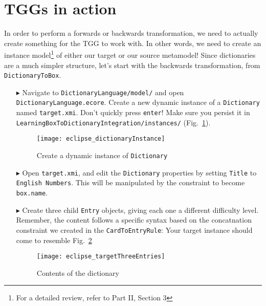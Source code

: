 \newpage
\section{TGGs in action}
\genHeader
\label{sect:TGGs_in_Action}

In order to perform a forwards or backwards transformation, we need to actually create something for the TGG to work with. In other words, we need to create an
instance model\footnote{For a detailed review, refer to Part II, Section 3} of either our target or our source metamodel! Since dictionaries are a much simpler
structure, let's start with the backwards transformation, from \texttt{DictionaryToBox}.

\begin{itemize}

\item[$\blacktriangleright$] Navigate to \texttt{Dictionary\-Language/model/} and open \texttt{Dictio\-nary\-Lang\-uage.ecore}. Create a new
dynamic instance of a \texttt{Dictionary} named \texttt{target.xmi}. Don't quickly press \texttt{enter}! Make sure you persist it in
\texttt{Learn\-ing\-Box\-To\-Dictionary\-In\-te\-gra\-tion/in\-stan\-ces/} (Fig.~\ref{fig:create_instance_dict}).

\begin{figure}[htbp]
\begin{center}
  \texttt{[image: eclipse\_dictionaryInstance]}
  \caption{Create a dynamic instance of \texttt{Dictionary}}
  \label{fig:create_instance_dict}
\end{center}
\end{figure}

\newpage

\item[$\blacktriangleright$] Open \texttt{target.xmi}, and edit the \texttt{Dictionary} properties by setting \texttt{Title} to \texttt{English Numbers}. This
will be manipulated by the constraint to become \texttt{box.name}.

\item[$\blacktriangleright$] Create three child \texttt{Entry} objects, giving each one a different difficulty level. Remember, the content follows a specific
syntax based on the concatnation constraint we created in the \texttt{CardToEntryRule}:
Your target instance should come to resemble Fig.~\ref{fig:dictionaryxmi}

\begin{figure}[htbp]
\begin{center}
  \texttt{[image: eclipse\_targetThreeEntries]}
  \caption{Contents of the dictionary}
  \label{fig:dictionaryxmi}
\end{center}
\end{figure}


\end{itemize}

